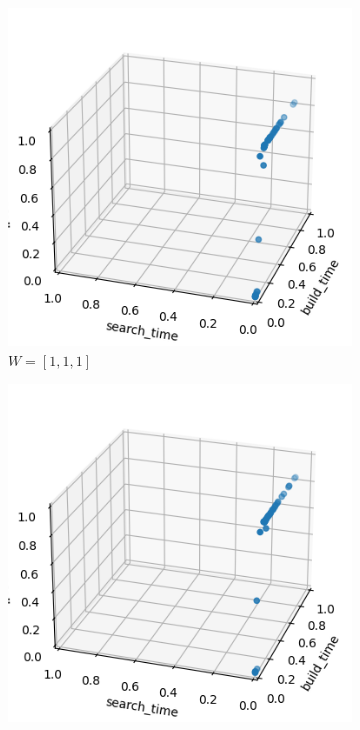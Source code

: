 \begin{figure}[ht]
    \centering
    \hfill
    \begin{subfigure}{0.24\textwidth}
        \includegraphics[width=\textwidth]{../images/report/bo-frontier111.png}
        \caption{\(W = [1, 1, 1]\)}
    \end{subfigure}
    \hfill
    \begin{subfigure}{0.24\textwidth}
        \includegraphics[width=\textwidth]{../images/report/bo-frontier211.png}

\end{subfigure}
\end{figure}
